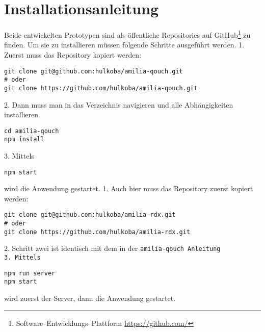 \section{Installationsanleitung}
Beide entwickelten Prototypen sind als öffentliche Repositories auf GitHub\footnote{Software--Entwicklungs--Plattform \url{https://github.com/}} zu finden. 
Um sie zu installieren müssen folgende Schritte ausgeführt werden.
1. Zuerst muss das Repository kopiert werden:
\begin{lstlisting}
git clone git@github.com:hulkoba/amilia-qouch.git
# oder
git clone https://github.com/hulkoba/amilia-qouch.git
\end{lstlisting}
2. Dann muss man in das Verzeichnis navigieren und alle Abhängigkeiten installieren.
\begin{lstlisting}
cd amilia-qouch
npm install
\end{lstlisting}
3. Mittels
\begin{lstlisting}
npm start
\end{lstlisting}
wird die Anwendung gestartet.
%
1. Auch hier muss das Repository zuerst kopiert werden:
\begin{lstlisting}
git clone git@github.com:hulkoba/amilia-rdx.git
# oder
git clone https://github.com/hulkoba/amilia-rdx.git
\end{lstlisting}
2. Schritt zwei ist identisch mit dem in der \tt{amilia-qouch} Anleitung\\
3. Mittels
\begin{lstlisting}
npm run server
npm start
\end{lstlisting}
wird zuerst der Server, dann die Anwendung gestartet.